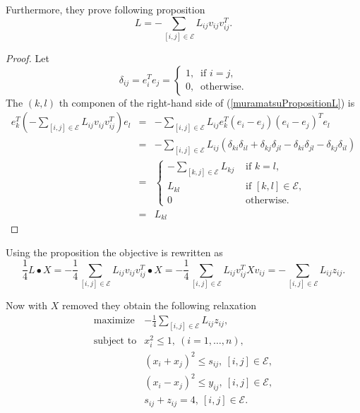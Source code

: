 \documentclass[12pt]{book}
\theoremstyle{definition}
\begin{document}
Furthermore, they prove following proposition
\prop \begin{equation}
\label{muramatsuPropositionL}
L = - \sum_{[i,j]\in \mathcal{E}} L_{ij}v_{ij}v_{ij}^T.
\end{equation}
\rm
\begin{proof}
 Let $$\delta_{ij} = e_i^Te_j = \left\lbrace \begin{array}{l}
1, \ \mbox{ if } i = j, \\
0, \ \mbox{ otherwise}.
\end{array}\right.$$
The $(k,l)$ th componen of the right-hand side of (\ref{muramatsuPropositionL}) is 
\begin{eqnarray*}
e_k^T\left(- \sum_{[i,j]\in \mathcal{E}} L_{ij}v_{ij}v_{ij}^T \right) e_l &=& - \sum_{[i,j]\in \mathcal{E}} L_{ij}e_k^T(e_i-e_j)(e_i-e_j)^Te_l \\
&=& - \sum_{[i,j]\in \mathcal{E}} L_{ij}(\delta_{ki}\delta_{il} + \delta_{kj}\delta_{jl} -  \delta_{ki}\delta_{jl} - \delta_{kj}\delta_{il}) \\
&=& \left\lbrace \begin{array}{ll}
- \sum_{[k,j]\in \mathcal{E}}L_{kj} & \mbox{ if } k = l ,\\
L_{kl} & \mbox{ if } [k,l]\in\mathcal{E}, \\
0 & \mbox{ otherwise.}
\end{array}\right. \\
&=& L_{kl}
\end{eqnarray*}
\end{proof}

Using the proposition the objective is rewritten as 
\begin{equation*}
\frac{1}{4}L\bullet X = -\frac{1}{4}\sum_{[i,j]\in \mathcal{E}} L_{ij}v_{ij}v_{ij}^T\bullet X = -\frac{1}{4} \sum_{[i,j]\in \mathcal{E}} L_{ij}v_{ij}^TXv_{ij} = - \sum_{[i,j]\in \mathcal{E}} L_{ij}z_{ij}.
\end{equation*}

Now with $X$ removed they obtain the following relaxation 
\begin{equation}
\begin{array}{ll}
\label{MaxCutSOCPRelax2}
\mbox{maximize} & - \frac{1}{4}\sum_{[i,j]\in \mathcal{E}} L_{ij}z_{ij}, \\
\mbox{subject to} & x_i^2\leq 1 , \ (i = 1,\dots ,n),\\
&	(x_i + x_j)^2 \leq s_{ij}, \ [i,j]\in \mathcal{E}, \\
& 	(x_i - x_j)^2 \leq y_{ij}, \ [i,j]\in \mathcal{E}, \\
& s_{ij} + z_{ij} = 4, \ [i,j]\in \mathcal{E}.
\end{array}
\end{equation}
\end{document}
